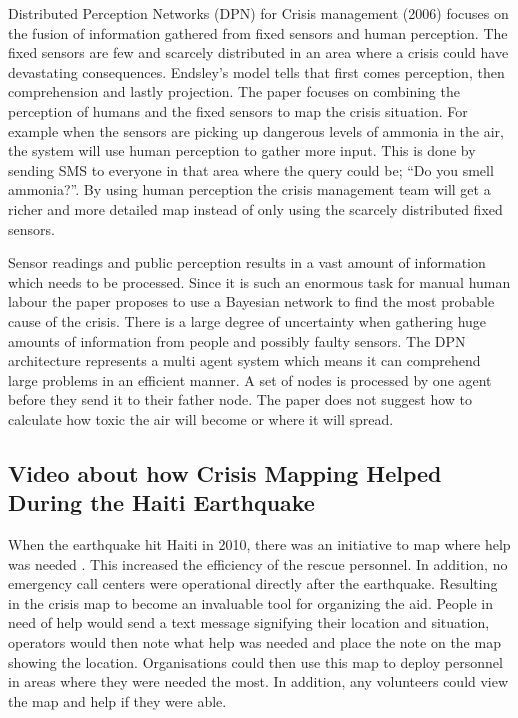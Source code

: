 Distributed Perception Networks (DPN) for Crisis management (2006)\cite{dpn} focuses on the fusion of information gathered from fixed sensors and human perception. The fixed sensors are few and scarcely distributed in an area where a crisis could have devastating consequences. Endsley’s model tells that first comes perception, then comprehension and lastly projection. The paper focuses on combining the perception of humans and the fixed sensors to map the crisis situation. For example when the sensors are picking up dangerous levels of ammonia in the air, the system will use human perception to gather more input. This is done by sending SMS to everyone in that area where the query could be; “Do you smell ammonia?”. By using human perception the crisis management team will get a richer and more detailed map instead of only using the scarcely distributed fixed sensors.

Sensor readings and public perception results in a vast amount of information which needs to be processed. Since it is such an enormous task for manual human labour the paper proposes to use a Bayesian network to find the most probable cause of the crisis. There is a large degree of uncertainty when gathering huge amounts of information from people and possibly faulty sensors. The DPN architecture represents a multi agent system which means it can comprehend large problems in an efficient manner. A set of nodes is processed by one agent before they send it to their father node. The paper does not suggest how to calculate how toxic the air will become or where it will spread.  

\subsection{Video about how Crisis Mapping Helped During the Haiti Earthquake}

When the earthquake hit Haiti in 2010, there was an initiative to map where help was needed \cite{usha}. This increased the efficiency of the rescue personnel. In addition, no emergency call centers were operational directly after the earthquake. Resulting in the crisis map to become an invaluable tool for organizing the aid. People in need of help would send a text message signifying their location and situation, operators would then note what help was needed and place the note on the map showing the location. Organisations could then use this map to deploy personnel in areas where they were needed the most. In addition, any volunteers could view the map and help if they were able.

